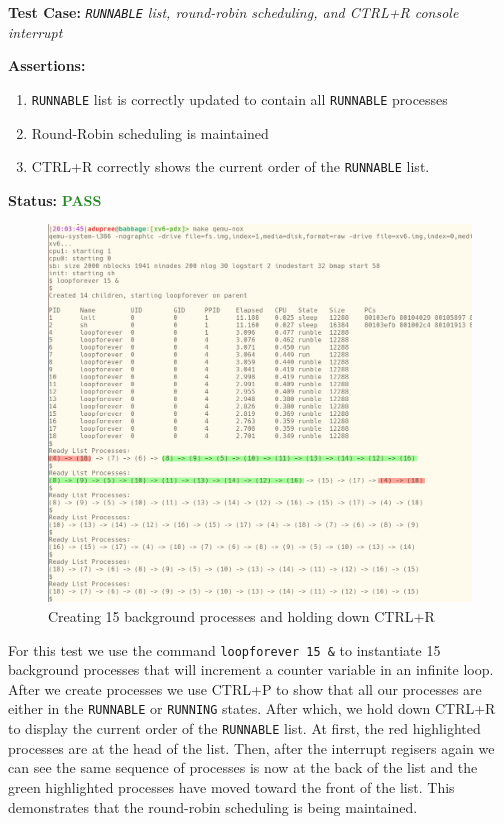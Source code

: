 \documentclass[11pt,letterpaper]{report}
\newcommand{\code}[1]{\colorbox{codegray}{\texttt{#1}}}
\begin{document}
{  \pagebreak

  \noindent\textbf{Test Case:} \emph{\code{RUNNABLE} list, round-robin scheduling, and CTRL+R console interrupt}
  
  \noindent\textbf{Assertions:}
  \begin{enumerate}[]
  \item \code{RUNNABLE} list is correctly updated to contain all \code{RUNNABLE} processes
  \item Round-Robin scheduling is maintained
  \item CTRL+R correctly shows the current order of the \code{RUNNABLE} list.
  \end{enumerate}  
  
  \noindent\textbf{Status:} \textcolor{ForestGreen}{\textbf{PASS}}
  
  \begin{figure}[h!]
	\centering
	\includegraphics[width=1\linewidth]{round-robin.png}
	\caption[img]{Creating 15 background processes and holding down CTRL+R}
	\label{fig:P1compileP0-1}
  \end{figure}

  For this test we use the command \code{loopforever 15 \&} to instantiate 15 background
  processes that will increment a counter variable in an infinite loop. After we create 
  processes we use CTRL+P to show that all our processes are either in the \code{RUNNABLE} 
  or \code{RUNNING} states. After which, we hold down CTRL+R to display the current order 
  of the \code{RUNNABLE} list. At first, the red highlighted processes are at the head of the 
  list. Then, after the interrupt regisers again we can see the same sequence of processes
  is now at the back of the list and the green highlighted processes have moved toward 
  the front of the list. This demonstrates that the round-robin scheduling is being 
  maintained.

\ifdefined \LF
} %
\fi
\end{document}
